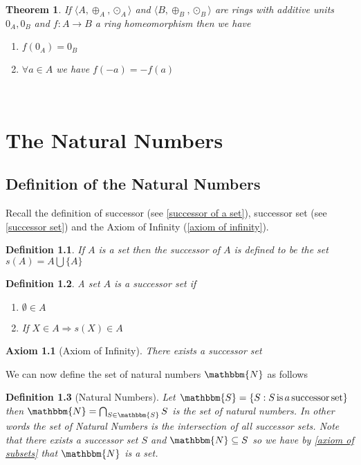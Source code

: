 \documentclass{book}
\newcommand{\tmop}[1]{\ensuremath{\operatorname{#1}}}
\newtheorem{axiom}{Axiom}
\newtheorem{definition}{Definition}
{\theorembodyfont{\rmfamily}\newtheorem{example}{Example}}
\newtheorem{theorem}{Theorem}
\begin{document}
{{\begin{theorem}
  If $\langle A, \oplus_A, \odot_A \rangle$ and $\langle B, \oplus_B, \odot_B
  \rangle$ are rings with additive units $0_A, 0_B$ and $f : A \rightarrow B$
  a ring homeomorphism then we have
  \begin{enumerate}
    \item $f (0_A) = 0_B$
    
    \item $\forall a \in A$ we have $f (- a) = - f (a)$
  \end{enumerate}
\end{theorem}

\

\chapter{The Natural Numbers}

\section{Definition of the Natural Numbers}

Recall the definition of successor (see \ref{successor of a set}), successor
set (see \ref{successor set}) and the Axiom of Infinity (\ref{axiom of
infinity}).

\begin{definition}
  If $A$ is a set then the successor of $A$ is defined to be the set $s (A) =
  A \bigcup \{ A \}$
\end{definition}

\begin{definition}
  A set $A$ is a successor set if
  \begin{enumerate}
    \item $\emptyset \in A$
    
    \item If $X \in A \Rightarrow s (X) \in A$
  \end{enumerate}
\end{definition}

\begin{axiom}[Axiom of Infinity]
  There exists a successor set
\end{axiom}

We can now define the set of natural numbers $\mathbbm{N}$ as follows

\begin{definition}[Natural Numbers]
  \label{natural numbers}{}Let $\mathbbm{S}= \{ S : S
  \tmop{is} a \tmop{successor} \tmop{set} \}$ then $\mathbbm{N}= \bigcap_{S
  \in \mathbbm{S}} S$ is the set of natural numbers. In other words the set of
  Natural Numbers is the intersection of all successor sets. Note that there
  exists a successor set $S$ and $\mathbbm{N} \subseteq S$ so we have by
  \ref{axiom of subsets} that $\mathbbm{N}$ is a set.
\end{definition}

}}
\end{document}
